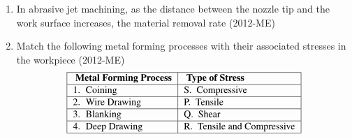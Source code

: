 \documentclass[journal,12pt,twocolumn]{IEEEtran}
\theoremstyle{remark}
\begin{document}
 \begin{enumerate}
		 
	 \item In abrasive jet machining, as the distance between the nozzle tip and the work surface increases, the material removal rate \hfill{(2012-ME)}
	 
\begin{enumerate}
\end{enumerate}


\item Match the following metal forming processes with their associated stresses in the workpiece \hfill{(2012-ME)}
\[
\begin{tabular}{ |l| l|}
\hline
\text{\textbf{ Metal Forming Process}} & \text{   \textbf{Type of Stress}} \\
\hline

1.  \  Coining &     S.   \      Compressive \\
\hline
2.   \ Wire Drawing &  P.   \    Tensile \\
\hline
3. \   Blanking  &  Q.     \     Shear \\
\hline
4. \   Deep Drawing  &  R.    \   Tensile and Compressive \\

\hline
\end{tabular}
\]


	\begin{enumerate}
\end{enumerate}


\end{enumerate}
\end{document}
